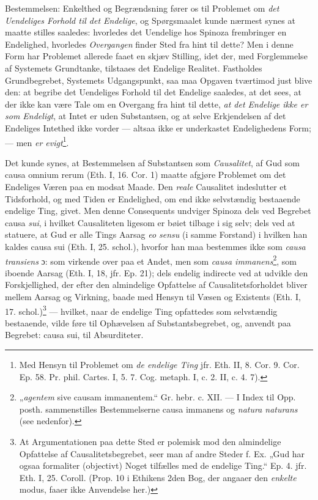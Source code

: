 \documentclass[12pt,a4paper]{book}
\newcommand{\opage}[1]{\marginnote{\footnotesize\textit{[#1]}}}
\begin{document}
Bestemmelsen: Enkelthed og Begrændsning fører os til Problemet om
\emph{det Uendeliges Forhold til det Endelige}, og Spørgsmaalet kunde
nærmest synes at maatte
\opage{55} stilles saaledes: hvorledes det Uendelige hos Spinoza frembringer en
Endelighed, hvorledes \emph{Overgangen} finder Sted fra hint til
dette? Men i denne Form har Problemet allerede faaet en skjæv
Stilling, idet der, med Forglemmelse af Systemets Grundtanke,
tilstaaes det Endelige Realitet. Fastholdes Grundbegrebet, Systemets
Udgangspunkt, saa maa Opgaven tværtimod just blive den: at begribe det
Uendeliges Forhold til det Endelige saaledes, at det sees, at der
ikke kan være Tale om en Overgang fra hint til dette, \emph{at det
Endelige ikke er som Endeligt}, at Intet er uden Substantsen,
og at selve Erkjendelsen af det Endeliges Intethed ikke vorder ---
altsaa ikke er underkastet Endelighedens Form; --- men \emph{er
evigt}\footnote{Med Hensyn til Problemet om \emph{de endelige Ting} jfr. Eth.
II, 8. Cor. 9. Cor. Ep. 58. Pr. phil. Cartes. I, 5. 7. Cog. metaph. I,
c. 2. II, c. 4. 7).}.

Det kunde synes, at Bestemmelsen af Substantsen som
\emph{Causalitet}, af Gud som causa omnium rerum (Eth. I, 16. Cor. 1)
maatte afgjøre Problemet om det Endeliges Væren paa en modsat Maade.
Den \emph{reale} Causalitet indeslutter et Tidsforhold, og med Tiden
er Endelighed, om end ikke selvstændig bestaaende endelige Ting,
givet. Men denne Consequents undviger Spinoza dels ved Begrebet causa
\emph{sui}, i hvilket Causaliteten ligesom er bøiet tilbage i sig selv; dels
ved at statuere, at Gud er alle Tings Aarsag \emph{eo sensu} (i samme
Forstand) i hvilken han kaldes causa sui (Eth. I, 25. schol.), hvorfor
han maa bestemmes ikke som \emph{causa transiens} ɔ: som virkende over
paa et Andet, men som \emph{causa immanens}\footnote{„\emph{agentem} sive
causam immanentem.“ Gr. hebr. c. XII. --- I Index til Opp. posth.
sammenstilles Bestemmelserne causa immanens og \emph{natura
naturans} (see nedenfor).}, som iboende Aarsag (Eth. I, 18, jfr. Ep.
21); dels endelig indirecte ved at udvikle den Forskjellighed, der
efter den almindelige Opfattelse af Causalitetsforholdet bliver
mellem Aarsag og Virkning, baade med Hensyn til Væsen og Existents
(Eth. I, 17. schol.)\footnote{At Argumentationen paa dette Sted er
polemisk mod den almindelige Opfattelse af Causalitetsbegrebet, seer
man af andre Steder f. Ex. „Gud har ogsaa formaliter (objectivt)
Noget tilfælles med de endelige Ting.“ Ep. 4. jfr. Eth. I, 25. Coroll.
(Prop. 10 i Ethikens 2den Bog, der angaaer den \emph{enkelte} modus, faaer
ikke Anvendelse her.)} ---
\opage{56} \setcounter{footnote}{0}%
hvilket, naar de endelige Ting opfattedes som selvstændig bestaaende,
vilde føre til Ophævelsen af Substantsbegrebet, og, anvendt paa
Begrebet: causa sui, til Absurditeter.
\end{document}

